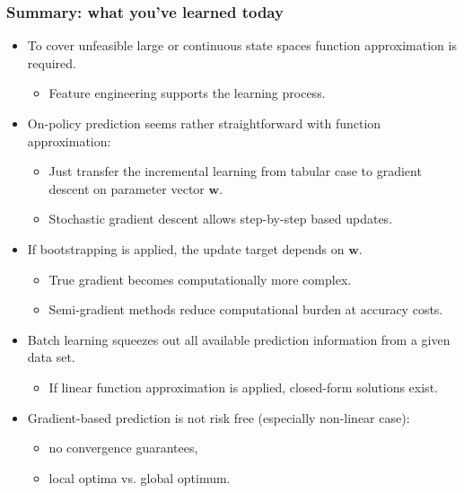 \begin{frame}
\frametitle{Summary: what you've learned today}
\begin{itemize}
	\item To cover unfeasible large or continuous state spaces function approximation is required.
	\begin{itemize}\pause
		\item Feature engineering supports the learning process.\pause
	\end{itemize}
	\item On-policy prediction seems rather straightforward with function approximation:
	\begin{itemize}
		\item Just transfer the incremental learning from tabular case to gradient descent on parameter vector $\bm{w}$.\pause
		\item Stochastic gradient descent allows step-by-step based updates.\pause
	\end{itemize}
	\item If bootstrapping is applied, the update target depends on $\bm{w}$.
	\begin{itemize}
		\item True gradient becomes computationally more complex.\pause
		\item Semi-gradient methods reduce computational burden at accuracy costs.\pause
	\end{itemize}
	\item Batch learning squeezes out all available prediction information from a given data set.\pause
	\begin{itemize}
		\item If linear function approximation is applied, closed-form solutions exist.\pause
	\end{itemize}
	\item Gradient-based prediction is not risk free (especially non-linear case):
	\begin{itemize}
		\item no convergence guarantees,
		\item local optima vs. global optimum.
	\end{itemize}
\end{itemize}
\end{frame}